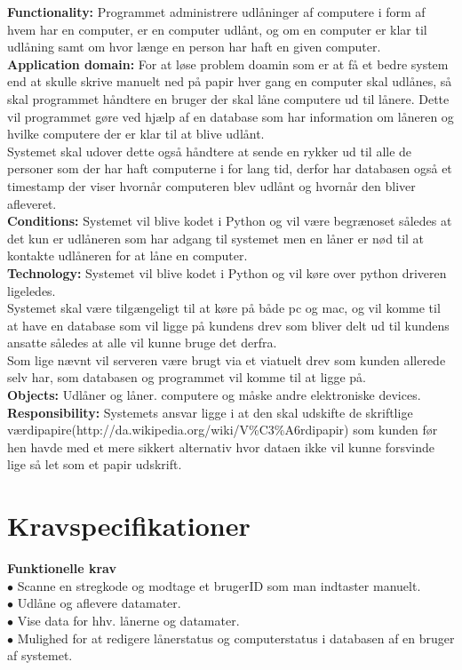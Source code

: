 \documentclass[a4paper]{article}
\begin{document}
\textbf{Functionality:} Programmet administrere udlåninger af computere i form af hvem har en computer, er en computer udlånt, og om en computer er klar til udlåning samt om hvor længe en person har haft en given computer.\\
\textbf{Application domain:} For at løse problem doamin som er at få et bedre system end at skulle skrive manuelt ned på papir hver gang en computer skal udlånes, så skal programmet håndtere en bruger der skal låne computere ud til lånere. Dette vil programmet gøre ved hjælp af en database som har information om låneren og hvilke computere der er klar til at blive udlånt.\\
Systemet skal udover dette også håndtere at sende en rykker ud til alle de personer som der har haft computerne i for lang tid, derfor har databasen også et timestamp der viser hvornår computeren blev udlånt og hvornår den bliver afleveret.\\
\textbf{Conditions:} Systemet vil blive kodet i Python og vil være begrænoset således at det kun er udlåneren som har adgang til systemet men en låner er nød til at kontakte udlåneren for at låne en computer.\\
\textbf{Technology:} Systemet vil blive kodet i Python og vil køre over python driveren ligeledes.\\
Systemet skal være tilgængeligt til at køre på både pc og mac, og vil komme til at have en database som vil ligge på kundens drev som bliver delt ud til kundens ansatte således at alle vil kunne bruge det derfra.\\
Som lige nævnt vil serveren være brugt via et viatuelt drev som kunden allerede selv har, som databasen og programmet vil komme til at ligge på.\\
\textbf{Objects:} Udlåner og låner. computere og måske andre elektroniske devices.\\
\textbf{Responsibility:} Systemets ansvar ligge i at den skal udskifte de skriftlige værdipapire(http://da.wikipedia.org/wiki/V\%C3\%A6rdipapir) som kunden før hen havde med et mere sikkert alternativ hvor dataen ikke vil kunne forsvinde lige så let som et papir udskrift.
\section{Kravspecifikationer}
\textbf{Funktionelle krav}\\
$\bullet$ Scanne en stregkode og modtage et brugerID som man indtaster manuelt. \\
$\bullet$ Udlåne og aflevere datamater. \\
$\bullet$ Vise data for hhv. lånerne og datamater. \\
$\bullet$ Mulighed for at redigere lånerstatus og computerstatus i databasen af en bruger af systemet. \\
\end{document}
